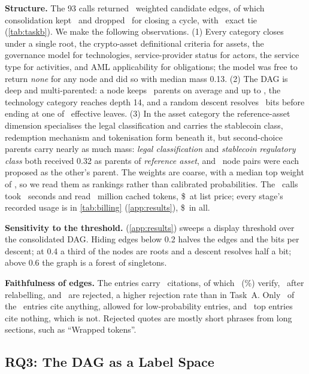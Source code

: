 \textbf{Structure.} The 93 calls returned \BWeighted\ weighted candidate edges,
of which consolidation kept \BEdges\ and dropped \BDropped\ for closing a cycle,
with \BTies\ exact tie (\cref{tab:taskb}). We make the following observations.
(1) Every category closes under a single root, the crypto-asset definitional
criteria for assets, the governance model for technologies, service-provider
status for actors, the service type for activities, and AML applicability for
obligations; the model was free to return \emph{none} for any node and did so
with median mass 0.13. (2) The DAG is deep and multi-parented: a node keeps
\BMeanParents\ parents on average and up to \BMaxParents, the technology category
reaches depth 14, and a random descent resolves \BBits\ bits before ending at
one of \BEffLeaves\ effective leaves. (3) In the asset category the reference-asset dimension
specialises the legal classification and carries the stablecoin class,
redemption mechanism and tokenisation form beneath it, but second-choice
parents carry nearly as much mass: \emph{legal classification} and
\emph{stablecoin regulatory class} both received 0.32 as parents of
\emph{reference asset}, and \BMutual\ node pairs were each proposed as the
other's parent. The weights are coarse, with a
median top weight of \BMedianTop, so we read them as rankings rather than
calibrated probabilities. The \BCalls\ calls took \BSeconds\ seconds and read
\BCacheTokens\ million cached tokens, \$\BillTaskB\ at list price; every
stage's recorded usage is in \cref{tab:billing} (\cref{app:results}),
\$\BillTotal\ in all.


\textbf{Sensitivity to the threshold.}  (\cref{app:results}) sweeps a display
threshold over the consolidated DAG. Hiding edges below 0.2 halves the edges
and the bits per descent; at 0.4 a third of the nodes are roots and a descent
resolves half a bit; above 0.6 the graph is a forest of singletons.

\textbf{Faithfulness of edges.} The entries carry \BCites\ citations, of which
\BVerified\ (\BVerifiedPct\%) verify, \BRelabelled\ after relabelling, and
\BRejected\ are rejected, a higher rejection rate than in Task~A. Only
\BEntriesCited\ of the \BWeighted\ entries cite anything, allowed for
low-probability entries, and \BTopNoCite\ top entries cite nothing, which is
not. Rejected quotes are mostly short phrases from long sections, such as
``Wrapped tokens''.

\subsection{RQ3: The DAG as a Label Space}
\label{sec:exp:rq3}

